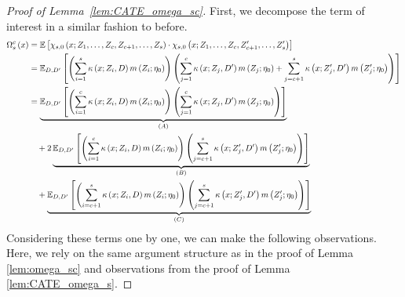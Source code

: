 \begin{proof}[Proof of Lemma~\ref{lem:CATE_omega_sc}]
    First, we decompose the term of interest in a similar fashion to before.
	\begin{equation}
        \begin{aligned}
            \Omega_{s}^{c}\left(x\right)
		    & = \mathbb{E}\left[\chi_{s,0}\left(x; Z_1, \ldots, Z_{c}, Z_{c+1}, \ldots, Z_{s}\right) \cdot
			\chi_{s,0}\left(x; Z_1, \ldots,Z_{c}, Z_{c+1}^{\prime}, \ldots, Z_{s}^{\prime}\right)\right]\\
            & = \mathbb{E}_{D, D^{\prime}}\left[
                \left(\sum_{i = 1}^{s} \kappa\left(x; Z_{i}, D\right) m\left(Z_{i}; \eta_{0}\right)\right) 
                \left(\sum_{j = 1}^{c} \kappa\left(x; Z_{j}, D^{\prime}\right) m\left(Z_{j}; \eta_{0}\right) + \sum_{j = c + 1}^{s} \kappa\left(x; Z_{j}^{\prime}, D^{\prime}\right) m\left(Z_{j}^{\prime}; \eta_{0}\right)\right)
            \right]\\
            & = \underbrace{\mathbb{E}_{D, D^{\prime}}\left[\left(\sum_{i = 1}^{c} \kappa\left(x; Z_{i}, D\right) m\left(Z_{i}; \eta_{0}\right)\right)
            \left(\sum_{j = 1}^{c} \kappa\left(x; Z_{j}, D^{\prime}\right) m\left(Z_{j}; \eta_{0}\right)\right)\right]}_{(A)} \\
            & \quad + 2\underbrace{\mathbb{E}_{D, D^{\prime}}\left[\left(\sum_{i = 1}^{c} \kappa\left(x; Z_{i}, D\right) m\left(Z_{i}; \eta_{0}\right)\right)
            \left(\sum_{j = c + 1}^{s} \kappa\left(x; Z_{j}^{\prime}, D^{\prime}\right) m\left(Z_{j}^{\prime}; \eta_{0}\right)\right)\right]}_{(B)} \\
            & \quad + \underbrace{\mathbb{E}_{D, D^{\prime}}\left[\left(\sum_{i = c + 1}^{s} \kappa\left(x; Z_{i}, D\right) m\left(Z_{i}; \eta_{0}\right)\right)
            \left(\sum_{j = c + 1}^{s} \kappa\left(x; Z_{j}^{\prime}, D^{\prime}\right) m\left(Z_{j}^{\prime}; \eta_{0}\right)\right)\right]}_{(C)} 
        \end{aligned}
    \end{equation}
    Considering these terms one by one, we can make the following observations.
    Here, we rely on the same argument structure as in the proof of Lemma \ref{lem:omega_sc} and observations from the proof of Lemma \ref{lem:CATE_omega_s}.

\end{proof}
